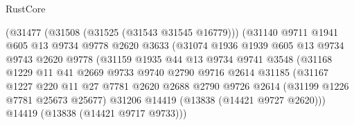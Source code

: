 \begin{lexlean}{RustCore}
\begin{coremodule}
                                (@31477
                                  (@31508 (@31525 (@31543 @31545 @16779)))
                                  (@31140
                                    @9711
                                    @1941
                                    @605
                                    @13
                                    @9734
                                    @9778
                                    @2620
                                    @3633
                                    (@31074
                                      @1936
                                      @1939
                                      @605
                                      @13
                                      @9734
                                      @9743
                                      @2620
                                      @9778
                                      (@31159
                                        @1935
                                        @44
                                        @13
                                        @9734
                                        @9741
                                        @3548
                                        (@31168
                                          @1229
                                          @11
                                          @41
                                          @2669
                                          @9733
                                          @9740
                                          @2790
                                          @9716
                                          @2614
                                          @31185
                                          (@31167
                                            @1227
                                            @220
                                            @11
                                            @27
                                            @7781
                                            @2620
                                            @2688
                                            @2790
                                            @9726
                                            @2614
                                            (@31199 @1226 @7781 @25673 @25677)
                                            @31206
                                            @14419
                                            (@13838 (@14421 @9727 @2620)))
                                          @14419
                                          (@13838 (@14421 @9717 @9733)))

\end{coremodule}
\end{lexlean}
